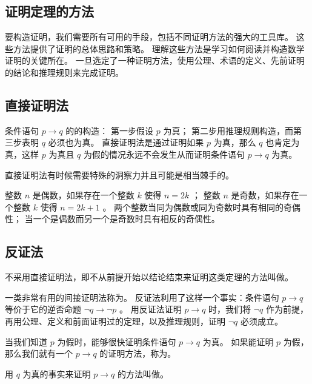 {    \subsection{证明定理的方法}
    {
        要构造证明，我们需要所有可用的手段，包括不同证明方法的强大的工具库。
        这些方法提供了证明的总体思路和策略。
        理解这些方法是学习如何阅读并构造数学证明的关键所在。
        一旦选定了一种证明方法，使用公理、术语的定义、先前证明的结论和推理规则来完成证明。
    }

    \subsection{直接证明法}
    {
        条件语句 $p \rightarrow q$ 的的构造：
        第一步假设 $p$ 为真；
        第二步用推理规则构造，而第三步表明 $q$ 必须也为真。
        直接证明法是通过证明如果 $p$ 为真，那么 $q$ 也肯定为真，这样 $p$ 为真且 $q$ 为假的情况永远不会发生从而证明条件语句 $p \rightarrow q$ 为真。

        直接证明法有时候需要特殊的洞察力并且可能是相当棘手的。

        \begin{defines}
            整数 $n$ 是偶数，如果存在一个整数 $k$ 使得 $n = 2k$ ；
            整数 $n$ 是奇数，如果存在一个整数 $k$ 使得 $n = 2k + 1$ 。
            两个整数当同为偶数或同为奇数时具有相同的奇偶性；
            当一个是偶数而另一个是奇数时具有相反的奇偶性。
        \end{defines}
    }

    \subsection{反证法}
    {
        不采用直接证明法，即不从前提开始以结论结束来证明这类定理的方法叫做。

        一类非常有用的间接证明法称为。
        反证法利用了这样一个事实：条件语句 $p \rightarrow q$ 等价于它的逆否命题 $\neg q \rightarrow \neg p$ 。
        用反证法证明 $p \rightarrow q$ 时，我们将 $\neg q$ 作为前提，再用公理、定义和前面证明过的定理，以及推理规则，证明 $\neg q$ 必须成立。

        {
            当我们知道 $p$ 为假时，能够很快证明条件语句 $p \rightarrow q$ 为真。
            如果能证明 $p$ 为假，那么我们就有一个 $p \rightarrow q$ 的证明方法，称为。

            用 $q$ 为真的事实来证明 $p \rightarrow q$ 的方法叫做。
        }

}}
